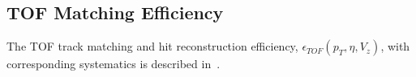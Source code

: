 \subsection{TOF Matching Efficiency}\label{section:star_TOFeffi}
The TOF track matching and hit reconstruction efficiency, $\epsilon_{TOF}\left(p_T,\eta,V_{z}\right)$, with corresponding systematics is  described in~\cite{supplementaryNote}.